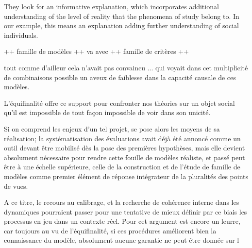 They look for an informative explanation, which incorporates additional understanding of the level of reality that the phenomena of study belong to. In our example, this means an explanation adding further understanding of social individuals.


































++ famille de modèles ++ va avec
++ famille de critères ++ 



 

tout comme d'ailleur cela n'avait pas convaincu ...  qui voyait dans cet multiplicité de combinaisons possible un aveux de faiblesse dans la capacité causale de ces modèles. 





L'équifinalité offre ce support pour confronter nos théories sur un objet social qu'il est impossible de tout façon impossible de voir dans son unicité.


Si on comprend les enjeux d'un tel projet, se pose alors les moyens de sa réalisation; la systématisation des évaluations avait déjà été annoncé comme un outil devant être mobilisé dès la pose des premières hypothèses, mais elle devient absolument nécessaire pour rendre cette fouille de modèles réaliste, et passé peut être à une échelle supérieure, celle de la construction et de l'étude de famille de modèles comme premier élément de réponse intégrateur de la pluralités des points de vues.

A ce titre, le recours au calibrage, et la recherche de cohérence interne dans les dynamiques pourraient passer pour une tentative de mieux définir par ce biais les processus en jeu dans un contexte réel. Pour \autocite{OSullivan2004} cet argument est encore un leurre, car toujours au vu de l'équifinalité, si ces procédures améliorent bien la connaissance du modèle, absolument aucune garantie ne peut être donnée sur l